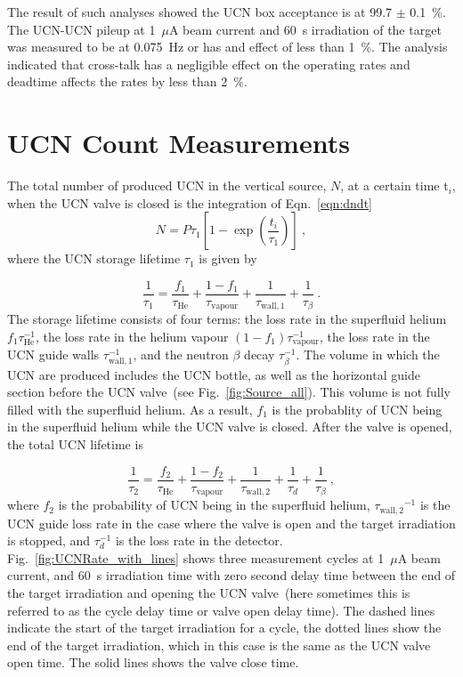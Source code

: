 The result of such analyses showed the UCN box acceptance is at
99.7 $\pm$ 0.1~\%. The UCN-UCN pileup at 1~$\mu$A beam current and 60~s
irradiation of the target was measured to be at 0.075~Hz or has and
effect of less than 1~\%. The analysis indicated that cross-talk has a
negligible effect on the operating rates and deadtime affects the
rates by less than 2~\%.



\section{UCN Count Measurements \label{UCNCounts}}

The total number of produced UCN in the vertical source, $N$, at a
certain time t$_i$, when the UCN valve is closed is the integration of
Eqn.~\ref{eqn:dndt}
\begin{equation}
  \label{eq:totalUCN}
  N = P \tau_1\left[ 1- \exp \left(\frac{t_i }{ \tau_1}\right) \right]~,
\end{equation}
where the UCN storage lifetime $\tau_1$ is given by

\begin{equation}
  \label{eqn:tau1}
  \frac{1}{\tau_1} = \frac{ f_1}{\tau_\mathrm{He}} + \frac{1-f_1}{\tau_\mathrm{vapour}}+\frac{1}{\tau_\mathrm{wall,1}} + \frac{1}{\tau_\beta}~.
\end{equation}
The storage lifetime consists of four terms: the loss rate in the
superfluid helium $ f_1\tau_\mathrm{He}^{-1}$, the loss rate in the
helium vapour $(1-f_1)\tau_\mathrm{vapour}^{-1}$, the loss rate in the
UCN guide walls $\tau_\mathrm{wall,1}^{-1}$, and the neutron $\beta$
decay $\tau_\beta^{-1}$. The volume in which the UCN are produced
includes the UCN bottle, as well as the horizontal guide section
before the UCN valve~(see Fig.~\ref{fig:Source_all}). This volume is
not fully filled with the superfluid helium. As a result, $ f_1$ is
the probablity of UCN being in the superfluid helium while the UCN
valve is closed. After the valve is opened, the total UCN lifetime is

\begin{equation}
  \label{eqn:tau2}
  \frac{1}{\tau_2} = \frac{ f_2}{\tau_\mathrm{He}} + \frac{1-f_2}{\tau_\mathrm{vapour}}+ \frac{1}{\tau_\mathrm{wall,2}}+\frac{1}{\tau_d} + \frac{1}{\tau_\beta}~,
\end{equation}
where $f_2$ is the probability of UCN being in the superfluid helium,
${\tau_\mathrm{wall,2}}^{-1}$ is the UCN guide loss rate in the case
where the valve is open and the target irradiation is stopped, and
$\tau_d^{-1}$ is the loss rate in the
detector. Fig.~\ref{fig:UCNRate_with_lines} shows three measurement
cycles at 1~$\mu$A beam current, and 60~s irradiation time with zero
second delay time between the end of the target irradiation and
opening the UCN valve~(here sometimes this is referred to as the cycle
delay time or valve open delay time). The dashed lines indicate the
start of the target irradiation for a cycle, the dotted lines show the
end of the target irradiation, which in this case is the same as the
UCN valve open time. The solid lines shows the valve close time.


